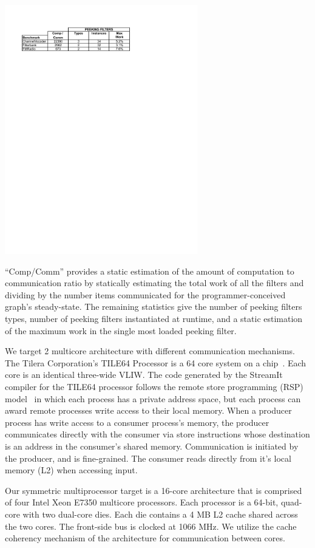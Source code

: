 {\centering
\includegraphics[width=3.3in]{figures/bench-char.pdf}}

\noindent ``Comp/Comm'' provides a static estimation of the
amount of computation to communication ratio by statically estimating the total
work of all the filters and dividing by the number items communicated
for the programmer-conceived graph's steady-state.  The remaining
statistics give the number of peeking filters types, number of peeking
filters instantiated at runtime, and a static estimation of the maximum
work in the single most loaded peeking filter.

We target 2 multicore architecture with different communication
mechanisms.  The Tilera Corporation's TILE64 Processor is a 64 core
system on a chip~\cite{tilera}.  Each core is an identical three-wide
VLIW. The code generated by the StreamIt
compiler for the TILE64 processor follows the remote store programming
(RSP) model~\cite{rsp10} in which each process has a private address
space, but each process can award remote processes write access to
their local memory. When a producer process has write access to a
consumer process's memory, the producer communicates directly with the
consumer via store instructions whose destination is an address in the
consumer's shared memory.  Communication is initiated by the producer,
and is fine-grained.  The consumer reads directly from it's local
memory (L2) when accessing input.

Our symmetric multiprocessor target is a 16-core architecture that is
comprised of four Intel Xeon E7350 multicore processors.  Each processor
is a 64-bit, quad-core with two dual-core dies.  Each die contains a 4
MB L2 cache shared across the two cores.  The front-side bus is clocked
at 1066 MHz.  We utilize the cache coherency mechanism of the
architecture for communication between cores. 


